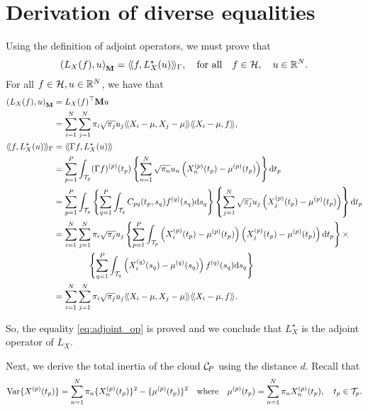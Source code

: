 \section{Derivation of diverse equalities} %
\label{sec:derivation_of_the_inertia_of_the_clouds}

Using the definition of adjoint operators, we must prove that
\begin{equation}\label{eq:adjoint_op}
    \left(L_X(f), u\right)_{\mathbf{M}} = \langle\!\langle f, L^\star_X(u)\rangle\!\rangle_\Gamma, \quad\text{for all}\quad f \in \mathcal{H},\quad u \in \mathbb{R}^N.
\end{equation}
For all $f \in \mathcal{H}, u \in \mathbb{R}^N$, we have that
\begin{align*}
    \inRM{L_X(f)}{u} &= L_X(f)^\top \mathbf{M} u \\
    &= \sum_{i = 1}^N\sum_{j = 1}^N \pi_i \sqrt{\pi_j} u_j \inH{X_i - \mu}{X_j - \mu}\inH{X_i - \mu}{f}, \\
    \inHG{f}{L^\star_X(u)} &= \inH{\Gamma f}{L^\star_X(u)} \\
    &= \sum_{p = 1}^P \int_{\TT{p}} (\Gamma f)^{(p)}(t_p) \left\{ \sum_{n = 1}^N \sqrt{\pi_n} u_n \left(\Xnp(t_p) - \mup{p}(t_p)\right) \right\} \dd t_p \\
    &= \sum_{p = 1}^P \int_{\TT{p}} \left\{\sum_{q = 1}^P \int_{\TT{q}} C_{pq}(t_p, s_q)f^{(q)}(s_q) \dd s_q\right\} \left\{ \sum_{j = 1}^N \sqrt{\pi_j} u_j \left(X_j^{(p)}(t_p) - \mup{p}(t_p)\right) \right\} \dd t_p \\
    &= \sum_{i = 1}^N \sum_{j = 1}^N \pi_i \sqrt{\pi_j} u_j \left\{\sum_{p = 1}^P \int_{\TT{p}} \left(X_i^{(p)}(t_p) - \mup{p}(t_p)\right)\left(X_j^{(p)}(t_p) - \mup{p}(t_p)\right)\dd t_p\right\} \times \\
    &\qquad\qquad \left\{\sum_{q = 1}^P \int_{\TT{q}} \left(X_i^{(q)}(s_q) - \mup{q}(s_q)\right)f^{(q)}(s_q)\dd s_q\right\} \\
    &= \sum_{i = 1}^N\sum_{j = 1}^N \pi_i \sqrt{\pi_j} u_j \inH{X_i - \mu}{X_j - \mu}\inH{X_i - \mu}{f}.
\end{align*}

So, the equality \eqref{eq:adjoint_op} is proved and we conclude that $L^\star_X$ is the adjoint operator of $L_X$.

Next, we derive the total inertia of the cloud $\mathcal{C}_{\!P}$ using the distance $d$. Recall that 
\begin{equation}\label{eq:var_appendix}
    \operatorname{Var}\{X^{(p)}(t_p)\} = \sum_{n = 1}^N \pi_n \{X_n^{(p)}(t_p)\}^2 - \{\mu^{(p)}(t_p)\}^2 \quad\text{where}\quad \mu^{(p)}(t_p) = \sum_{n = 1}^N \pi_nX_n^{(p)}(t_p), \quad t_p \in \mathcal{T}_{p}.
\end{equation}

